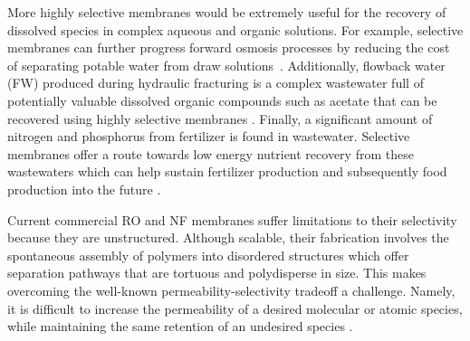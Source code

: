 \documentclass[journal=jpcbfk,manuscript=article]{achemso}
\begin{document}
  More highly selective membranes would be extremely useful for the recovery of
  dissolved species in complex aqueous and organic solutions. For example,
  selective membranes can further progress forward osmosis processes by reducing
  the cost of separating potable water from draw
  solutions~\cite{mccutcheon_novel_2005}. Additionally, flowback water (FW)
  produced during hydraulic fracturing is a complex wastewater full of
  potentially valuable dissolved organic compounds such as acetate that can be
  recovered using highly selective membranes \cite{dischinger_application_2017}.
  Finally, a significant amount of nitrogen and phosphorus from fertilizer is
  found in wastewater. Selective membranes offer a route towards low energy
  nutrient recovery from these wastewaters which can help sustain fertilizer
  production and subsequently food production into the future
  \cite{xie_membrane-based_2016}.
  


  Current commercial RO and NF membranes suffer limitations to their selectivity
  because they are unstructured. Although scalable, their fabrication involves the 
  spontaneous assembly of polymers into disordered structures which offer separation 
  pathways that are tortuous and polydisperse in size. This makes overcoming the well-known 
  permeability-selectivity tradeoff a challenge. Namely, it is difficult to increase
  the permeability of a desired molecular or atomic species, while maintaining the 
  same retention of an undesired species \cite{werber_materials_2016}. 
\end{document}
